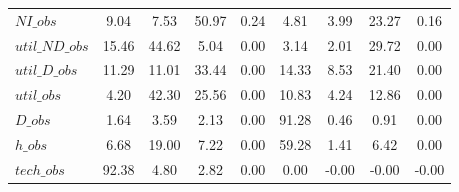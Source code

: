 \begin{center}
\begin{longtable}{lcccccccc}
$NI\_obs        $	 & 	         9.04	 & 	         7.53	 & 	        50.97	 & 	         0.24	 & 	         4.81	 & 	         3.99	 & 	        23.27	 & 	         0.16 \\ 
$util\_ND\_obs  $	 & 	        15.46	 & 	        44.62	 & 	         5.04	 & 	         0.00	 & 	         3.14	 & 	         2.01	 & 	        29.72	 & 	         0.00 \\ 
$util\_D\_obs   $	 & 	        11.29	 & 	        11.01	 & 	        33.44	 & 	         0.00	 & 	        14.33	 & 	         8.53	 & 	        21.40	 & 	         0.00 \\ 
$util\_obs      $	 & 	         4.20	 & 	        42.30	 & 	        25.56	 & 	         0.00	 & 	        10.83	 & 	         4.24	 & 	        12.86	 & 	         0.00 \\ 
$D\_obs         $	 & 	         1.64	 & 	         3.59	 & 	         2.13	 & 	         0.00	 & 	        91.28	 & 	         0.46	 & 	         0.91	 & 	         0.00 \\ 
$h\_obs         $	 & 	         6.68	 & 	        19.00	 & 	         7.22	 & 	         0.00	 & 	        59.28	 & 	         1.41	 & 	         6.42	 & 	         0.00 \\ 
$tech\_obs      $	 & 	        92.38	 & 	         4.80	 & 	         2.82	 & 	         0.00	 & 	         0.00	 & 	        -0.00	 & 	        -0.00	 & 	        -0.00 \\ 
\end{longtable}
 \end{center}
